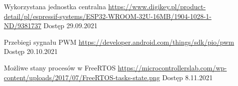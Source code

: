 \begin{thebibliography}{9}
        Wykorzystana jednostka centralna \newline
        \url{https://www.digikey.pl/product-detail/pl/espressif-systems/ESP32-WROOM-32U-16MB/1904-1028-1-ND/9381737} \newline
        Dostęp 29.09.2021
        
        Przebiegi sygnału PWM \newline
        \url{https://developer.android.com/things/sdk/pio/pwm} \newline
        Dostęp 20.10.2021
        
        Możliwe stany procesów w FreeRTOS \newline
        \url{https://microcontrollerslab.com/wp-content/uploads/2017/07/FreeRTOS-tasks-state.png} \newline
        Dostęp 8.11.2021

  \end{thebibliography}
  
  